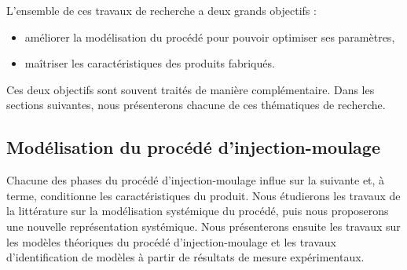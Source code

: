 \noindent
L'ensemble de ces travaux de recherche a deux grands objectifs :
\begin{itemize}
	\item améliorer la modélisation du procédé pour pouvoir optimiser ses paramètres,
	\item maîtriser les caractéristiques des produits fabriqués.
\end{itemize}
Ces deux objectifs sont souvent traités de manière complémentaire.
Dans les sections suivantes, nous présenterons chacune de ces thématiques de recherche.

\subsection{Modélisation du procédé d'injection-moulage} \label{subsec:molding_model}
Chacune des phases du procédé d'injection-moulage influe sur la suivante et, à terme, conditionne les caractéristiques du produit.
Nous étudierons les travaux de la littérature sur la modélisation systémique du procédé, puis nous proposerons une nouvelle représentation systémique.
Nous présenterons ensuite les travaux sur les modèles théoriques du procédé d'injection-moulage et les travaux d'identification de modèles à partir de résultats de mesure expérimentaux.

